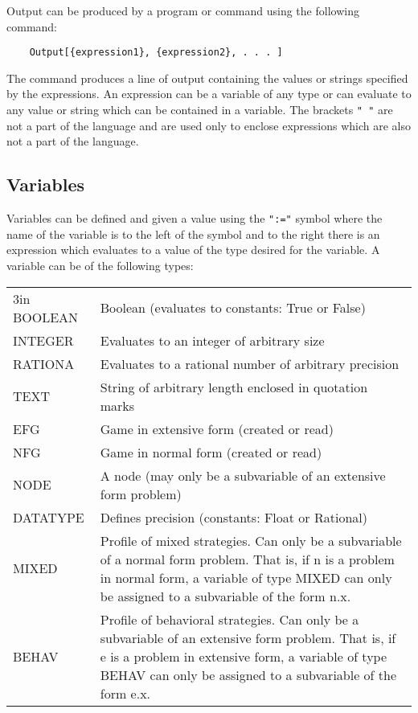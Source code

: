 Output can be produced by a program or command using the following command:

\begin{verbatim}
	Output[{expression1}, {expression2}, . . . ]
\end{verbatim}

The command produces a line of output containing the values or strings 
specified by the expressions.  An expression can be a variable of any type or 
can evaluate to any value or string which can be contained in a variable.  The 
brackets {\tt "{ }"} are not a part of the language and are used only to 
enclose expressions which are also not a part of the language.

\subsection*{Variables}

Variables can be defined and given a value using the {\tt ":="} symbol 
where the name of the variable is to the left of the symbol and to the right 
there is an expression which evaluates to a value of the type desired for 
the variable. A variable can be of the following types:

\medskip

\begin{tabular}{lp}{3in}
BOOLEAN & Boolean (evaluates to constants:  True or False)\\
INTEGER & Evaluates to an integer of arbitrary size \\
RATIONA & Evaluates to a rational number of arbitrary precision\\
TEXT	& String of arbitrary length enclosed in quotation marks\\
EFG	& Game in extensive form (created or read)\\
NFG	& Game in normal form (created or read)\\
NODE	& A node (may only be a subvariable of an extensive form
problem) \\
DATATYPE & Defines precision (constants:  Float or Rational) \\
MIXED	& {Profile of mixed strategies.  Can only be a subvariable of a
normal form problem.  That is, if n is a problem in normal form, a
variable of type MIXED can only be assigned to a subvariable of the
form n.x.}\\
BEHAV	& Profile of behavioral strategies.  Can only be a subvariable
of an extensive form problem.  That is, if e is a problem in extensive
form, a variable of type BEHAV can only be assigned to a subvariable
of the form e.x. \\
\end{tabular}

